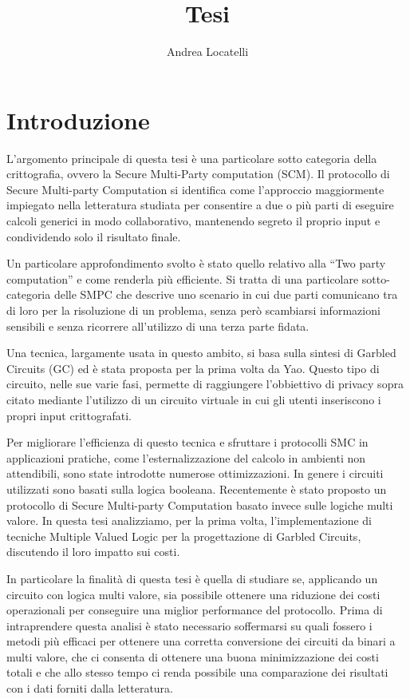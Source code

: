 \documentclass[]{book}
\title{Tesi}
\author{Andrea Locatelli}
\date{}
\begin{document}
\maketitle

{
\setcounter{tocdepth}{1}
\tableofcontents
}
\hypertarget{introduzione}{%
\chapter*{Introduzione}\label{introduzione}}

L'argomento principale di questa tesi è una particolare sotto categoria della crittografia, ovvero la Secure Multi-Party computation (SCM). Il protocollo di Secure Multi-party Computation si identifica come l'approccio maggiormente impiegato nella letteratura studiata per consentire a due o più parti di eseguire calcoli generici in modo collaborativo, mantenendo segreto il proprio input e condividendo solo il risultato finale.

Un particolare approfondimento svolto è stato quello relativo alla ``Two party computation'' e come renderla più efficiente.
Si tratta di una particolare sotto-categoria delle SMPC che descrive uno scenario in cui due parti comunicano tra di loro per la risoluzione di un problema, senza però scambiarsi informazioni sensibili e senza ricorrere all'utilizzo di una terza parte fidata.

Una tecnica, largamente usata in questo ambito, si basa sulla sintesi di Garbled Circuits (GC) ed è stata proposta per la prima volta da Yao. Questo tipo di circuito, nelle sue varie fasi, permette di raggiungere l'obbiettivo di privacy sopra citato mediante l'utilizzo di un circuito virtuale in cui gli utenti inseriscono i propri input crittografati.

Per migliorare l'efficienza di questo tecnica e sfruttare i protocolli SMC in applicazioni pratiche, come l'esternalizzazione del calcolo in ambienti non attendibili, sono state introdotte numerose ottimizzazioni. In genere i circuiti utilizzati sono basati sulla logica booleana. Recentemente è stato proposto un protocollo di Secure Multi-party Computation basato invece sulle logiche multi valore. In questa tesi analizziamo, per la prima volta, l'implementazione di tecniche Multiple Valued Logic per la progettazione di Garbled Circuits, discutendo il loro impatto sui costi.

In particolare la finalità di questa tesi è quella di studiare se, applicando un circuito con logica multi valore, sia possibile ottenere una riduzione dei costi operazionali per conseguire una miglior performance del protocollo. Prima di intraprendere questa analisi è stato necessario soffermarsi su quali fossero i metodi più efficaci per ottenere una corretta conversione dei circuiti da binari a multi valore, che ci consenta di ottenere una buona minimizzazione dei costi totali e che allo stesso tempo ci renda possibile una comparazione dei risultati con i dati forniti dalla letteratura.
\end{document}

